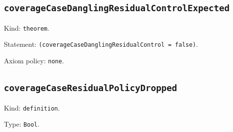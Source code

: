 \documentclass[11pt]{article}
\begin{document}
\subsection*{\texttt{coverageCaseDanglingResidualControlExpected}}
\noindent Kind: \texttt{theorem}.\par
\noindent Statement: \texttt{(coverageCaseDanglingResidualControl = false)}.\par
\noindent Axiom policy: \texttt{none}.\par
\subsection*{\texttt{coverageCaseResidualPolicyDropped}}
\noindent Kind: \texttt{definition}.\par
\noindent Type: \texttt{Bool}.\par
\end{document}
